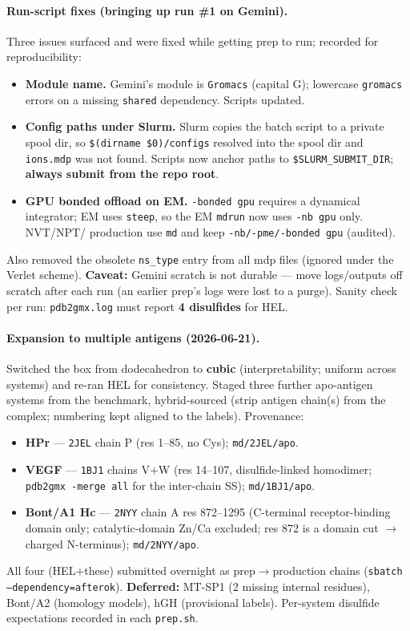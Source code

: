 \paragraph{Run-script fixes (bringing up run \#1 on Gemini).} Three issues surfaced and were
fixed while getting prep to run; recorded for reproducibility:
\begin{itemize}
  \item \textbf{Module name.} Gemini's module is \texttt{Gromacs} (capital G); lowercase
        \texttt{gromacs} errors on a missing \texttt{shared} dependency. Scripts updated.
  \item \textbf{Config paths under Slurm.} Slurm copies the batch script to a private spool
        dir, so \texttt{\$(dirname \$0)/configs} resolved into the spool dir and \texttt{ions.mdp}
        was not found. Scripts now anchor paths to \texttt{\$SLURM\_SUBMIT\_DIR};
        \textbf{always submit from the repo root}.
  \item \textbf{GPU bonded offload on EM.} \texttt{-bonded gpu} requires a dynamical integrator;
        EM uses \texttt{steep}, so the EM \texttt{mdrun} now uses \texttt{-nb gpu} only. NVT/NPT/
        production use \texttt{md} and keep \texttt{-nb/-pme/-bonded gpu} (audited).
\end{itemize}
Also removed the obsolete \texttt{ns\_type} entry from all mdp files (ignored under the Verlet
scheme). \textbf{Caveat:} Gemini scratch is not durable --- move logs/outputs off scratch after
each run (an earlier prep's logs were lost to a purge). Sanity check per run: \texttt{pdb2gmx.log}
must report \textbf{4 disulfides} for HEL.

\paragraph{Expansion to multiple antigens (2026-06-21).} Switched the box from dodecahedron to
\textbf{cubic} (interpretability; uniform across systems) and re-ran HEL for consistency. Staged
three further apo-antigen systems from the benchmark, hybrid-sourced (strip antigen chain(s) from
the complex; numbering kept aligned to the labels). Provenance:
\begin{itemize}
  \item \textbf{HPr} --- \texttt{2JEL} chain P (res 1--85, no Cys); \texttt{md/2JEL/apo}.
  \item \textbf{VEGF} --- \texttt{1BJ1} chains V$+$W (res 14--107, disulfide-linked homodimer;
        \texttt{pdb2gmx -merge all} for the inter-chain SS); \texttt{md/1BJ1/apo}.
  \item \textbf{Bont/A1 Hc} --- \texttt{2NYY} chain A res 872--1295 (C-terminal receptor-binding
        domain only; catalytic-domain Zn/Ca excluded; res 872 is a domain cut $\to$ charged
        N-terminus); \texttt{md/2NYY/apo}.
\end{itemize}
All four (HEL$+$these) submitted overnight as prep$\to$production chains
(\texttt{sbatch --dependency=afterok}). \textbf{Deferred:} MT-SP1 (2 missing internal residues),
Bont/A2 (homology models), hGH (provisional labels). Per-system disulfide
expectations recorded in each \texttt{prep.sh}.


